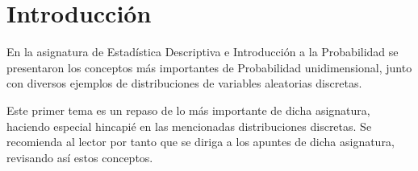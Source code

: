 \setcounter{chapter}{-1}
\chapter{Introducción}

En la asignatura de Estadística Descriptiva e Introducción a la Probabilidad
se presentaron los conceptos más importantes de Probabilidad unidimensional,
junto con diversos ejemplos de distribuciones de variables aleatorias discretas.

Este primer tema es un repaso de lo más importante de dicha asignatura, haciendo especial
hincapié en las mencionadas distribuciones discretas. Se recomienda al lector por tanto que se diriga a
los apuntes de dicha asignatura, revisando así estos conceptos.